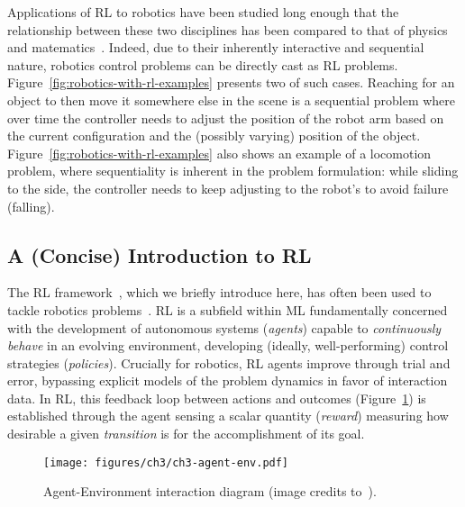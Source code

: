 Applications of RL to robotics have been studied long enough that the relationship between these two disciplines has been compared to that of physics and matematics~\citep{koberReinforcementLearningRobotics}.
Indeed, due to their inherently interactive and sequential nature, robotics control problems can be directly cast as RL problems.
Figure~\ref{fig:robotics-with-rl-examples} presents two of such cases.
Reaching for an object to then move it somewhere else in the scene is a sequential problem where over time the controller needs to adjust the position of the robot arm based on the current configuration and the (possibly varying) position of the object.
Figure~\ref{fig:robotics-with-rl-examples} also shows an example of a locomotion problem, where sequentiality is inherent in the problem formulation: while sliding to the side, the controller needs to keep adjusting to the robot's to avoid failure (falling).

\subsection{A (Concise) Introduction to RL}
The RL framework~\citep{suttonReinforcementLearningIntroduction2018}, which we briefly introduce here, has often been used to tackle robotics problems~\citep{koberReinforcementLearningRobotics}.
RL is a subfield within ML fundamentally concerned with the development of autonomous systems (\emph{agents}) capable to \emph{continuously behave} in an evolving environment, developing (ideally, well-performing) control strategies (\emph{policies}).
Crucially for robotics, RL agents improve through trial and error, bypassing explicit models of the problem dynamics in favor of interaction data.
In RL, this feedback loop between actions and outcomes (Figure~\ref{fig:rl-most-famous-pic}) is established through the agent sensing a scalar quantity (\emph{reward}) measuring how desirable a given \emph{transition} is for the accomplishment of its goal.

\begin{figure}
    \centering
    \texttt{[image: figures/ch3/ch3-agent-env.pdf]}
    \caption{Agent-Environment interaction diagram (image credits to~\citet{suttonReinforcementLearningIntroduction2018}).}
    \label{fig:rl-most-famous-pic}
\end{figure}

